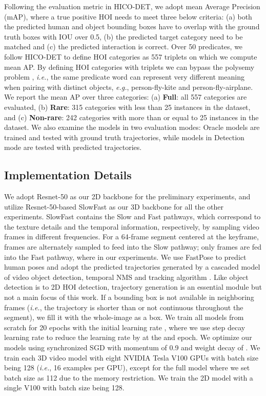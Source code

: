 \documentclass[sigconf]{acmart}
\begin{document}
Following the evaluation metric in HICO-DET, we adopt mean Average Precision (mAP), where a true positive HOI needs to meet three below criteria: (a) both the predicted human and object bounding boxes have to overlap with the ground truth boxes with IOU over 0.5, (b) the predicted target category need to be matched and (c) the predicted interaction is correct. 
Over 50 predicates, we follow HICO-DET to define HOI categories as 557 triplets on which we compute mean AP.
By defining HOI categories with triplets we can bypass the polysemy problem \cite{zhong2020polysemy}, \emph{i.e.}, the same predicate word can represent very different meaning when pairing with distinct objects, \emph{e.g.}, {\selectfont person-fly-kite} and {\selectfont person-fly-airplane}.
We report the mean AP over three categories: (a) \textbf{Full}: all 557 categories are evaluated, (b) \textbf{Rare}: 315 categories with less than 25 instances in the dataset, and (c) \textbf{Non-rare}: 242 categories with more than or equal to 25 instances in the dataset.
We also examine the models in two evaluation modes: {\selectfont Oracle} models are trained and tested with ground truth trajectories, while models in {\selectfont Detection} mode are tested with predicted trajectories.

\subsection{Implementation Details}
\label{subsec:implementation}

We adopt Resnet-50 \cite{he2016deep} as our 2D backbone for the preliminary experiments, and utilize Resnet-50-based SlowFast \cite{feichtenhofer2019slowfast} as our 3D backbone for all the other experiments.
SlowFast contains the Slow and Fast pathways, which correspond to the texture details and the temporal information, respectively, by sampling video frames in different frequencies.
For a 64-frame segment centered at the keyframe,  frames are alternately sampled to feed into the Slow pathway; only  frames are fed into the Fast pathway, where  in our experiments. 
We use FastPose \cite{fang2017rmpe} to predict human poses and adopt the predicted trajectories generated by a cascaded model of video object detection, temporal NMS and tracking algorithm \cite{sun2019video}. 
Like object detection is to 2D HOI detection, trajectory generation is an essential module but not a main focus of this work.
If a bounding box is not available in neighboring frames (\emph{i.e.}, the trajectory is shorter than  or not continuous throughout the segment), we fill it with the whole-image as a box.
We train all models from scratch for 20 epochs with the initial learning rate , where we use step decay learning rate to reduce the learning rate by  at the  and  epoch.
We optimize our models using synchronized SGD with momentum of 0.9 and weight decay of .
We train each 3D video model with eight NVIDIA Tesla V100 GPUs with batch size being 128 (\emph{i.e.}, 16 examples per GPU), except for the full model where we set batch size as 112 due to the memory restriction.
We train the 2D model with a single V100 with batch size being 128.
\end{document}
